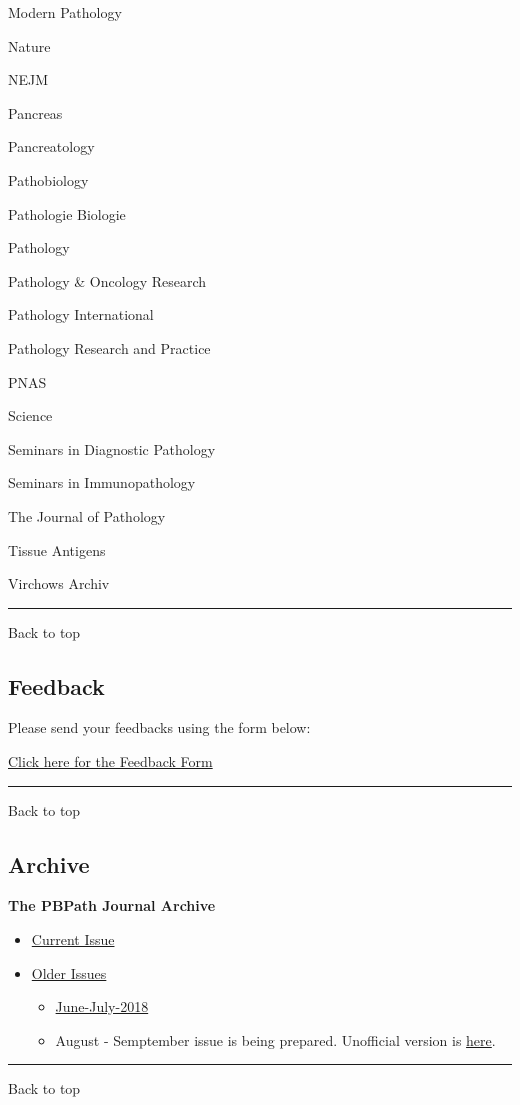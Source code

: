 \documentclass[]{article}
\begin{document}
Modern Pathology

Nature

NEJM

Pancreas

Pancreatology

Pathobiology

Pathologie Biologie

Pathology

Pathology \& Oncology Research

Pathology International

Pathology Research and Practice

PNAS

Science

Seminars in Diagnostic Pathology

Seminars in Immunopathology

The Journal of Pathology

Tissue Antigens

Virchows Archiv

\begin{center}\rule{0.5\linewidth}{\linethickness}\end{center}

Back to top

\pagebreak

\hypertarget{feedback}{%
\subsection{Feedback}\label{feedback}}

Please send your feedbacks using the form below:

\href{https://docs.google.com/forms/d/e/1FAIpQLSeD3Z9J6Y7eMmiyM12f_SfAmHUlykb1zxZcwO6lg7cebGYQIQ/viewform}{Click
here for the Feedback Form}

\begin{center}\rule{0.5\linewidth}{\linethickness}\end{center}

Back to top

\pagebreak

\hypertarget{archive}{%
\subsection{Archive}\label{archive}}

\textbf{The PBPath Journal Archive}

\begin{itemize}
\item
  \href{http://pbpath.org/journal-watch/}{Current Issue}
\item
  \href{http://pbpath.org/journal-watch-archive/}{Older Issues}

  \begin{itemize}
  \item
    \href{http://pbpath.org/pbpath-journal-watch-june-july-2018/}{June-July-2018}
  \item
    August - Semptember issue is being prepared. Unofficial version is
    \href{http://pbpath.org/journal-watch-upcoming-issue/}{here}.
  \end{itemize}
\end{itemize}

\begin{center}\rule{0.5\linewidth}{\linethickness}\end{center}

Back to top
\end{document}
